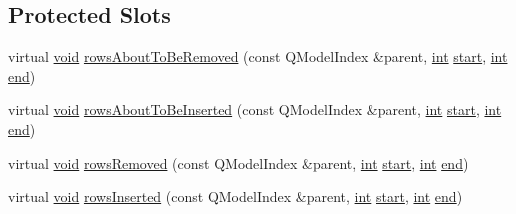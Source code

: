 \subsection*{Protected Slots}
\begin{DoxyCompactItemize}
\item 
virtual \hyperlink{group___u_a_v_objects_plugin_ga444cf2ff3f0ecbe028adce838d373f5c}{void} \hyperlink{class_qxt_schedule_view_a81610ed09b24970aeffab96b6d24bcf0}{rows\-About\-To\-Be\-Removed} (const Q\-Model\-Index \&parent, \hyperlink{ioapi_8h_a787fa3cf048117ba7123753c1e74fcd6}{int} \hyperlink{glext_8h_a13be19455586e95d5a42ed8f054afad2}{start}, \hyperlink{ioapi_8h_a787fa3cf048117ba7123753c1e74fcd6}{int} \hyperlink{glext_8h_a432111147038972f06e049e18a837002}{end})
\item 
virtual \hyperlink{group___u_a_v_objects_plugin_ga444cf2ff3f0ecbe028adce838d373f5c}{void} \hyperlink{class_qxt_schedule_view_a173b84c5a999261e70bbe4a73391f96c}{rows\-About\-To\-Be\-Inserted} (const Q\-Model\-Index \&parent, \hyperlink{ioapi_8h_a787fa3cf048117ba7123753c1e74fcd6}{int} \hyperlink{glext_8h_a13be19455586e95d5a42ed8f054afad2}{start}, \hyperlink{ioapi_8h_a787fa3cf048117ba7123753c1e74fcd6}{int} \hyperlink{glext_8h_a432111147038972f06e049e18a837002}{end})
\item 
virtual \hyperlink{group___u_a_v_objects_plugin_ga444cf2ff3f0ecbe028adce838d373f5c}{void} \hyperlink{class_qxt_schedule_view_a4f081700877813eb99198a6692bb137e}{rows\-Removed} (const Q\-Model\-Index \&parent, \hyperlink{ioapi_8h_a787fa3cf048117ba7123753c1e74fcd6}{int} \hyperlink{glext_8h_a13be19455586e95d5a42ed8f054afad2}{start}, \hyperlink{ioapi_8h_a787fa3cf048117ba7123753c1e74fcd6}{int} \hyperlink{glext_8h_a432111147038972f06e049e18a837002}{end})
\item 
virtual \hyperlink{group___u_a_v_objects_plugin_ga444cf2ff3f0ecbe028adce838d373f5c}{void} \hyperlink{class_qxt_schedule_view_a084daec1b60fa475b2d2831c8ca37049}{rows\-Inserted} (const Q\-Model\-Index \&parent, \hyperlink{ioapi_8h_a787fa3cf048117ba7123753c1e74fcd6}{int} \hyperlink{glext_8h_a13be19455586e95d5a42ed8f054afad2}{start}, \hyperlink{ioapi_8h_a787fa3cf048117ba7123753c1e74fcd6}{int} \hyperlink{glext_8h_a432111147038972f06e049e18a837002}{end})
\end{DoxyCompactItemize}
